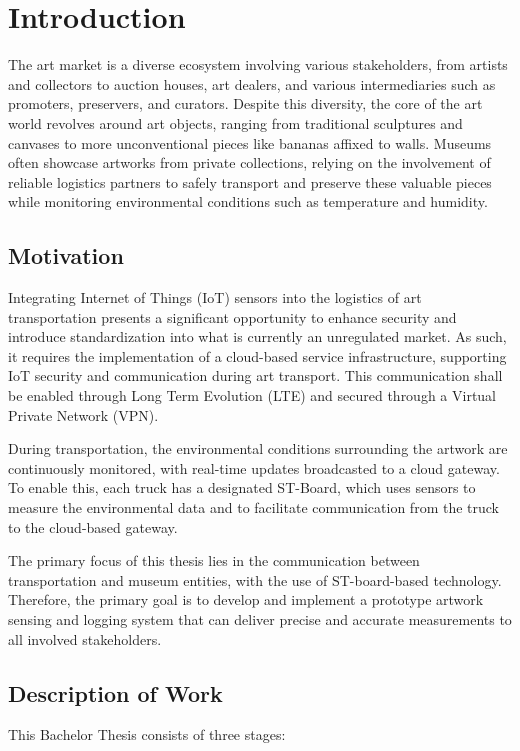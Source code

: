 \chapter{Introduction}
The art market is a diverse ecosystem involving various stakeholders,  from artists and collectors to auction houses, art dealers, and various intermediaries such as promoters, preservers, and curators. Despite this diversity, the core of the art world revolves around art objects, ranging from traditional sculptures and canvases to more unconventional pieces like bananas affixed to walls. Museums often showcase artworks from private collections, relying on the involvement of reliable logistics partners to safely transport and preserve these valuable pieces while monitoring environmental conditions such as temperature and humidity. 

\section{Motivation}
Integrating Internet of Things (IoT) sensors into the logistics of art transportation presents a significant opportunity to enhance security and introduce standardization into what is currently an unregulated market.
As such, it requires the implementation of a cloud-based service infrastructure, supporting IoT security and communication during art transport. This communication shall be enabled
through Long Term Evolution (LTE) and secured through a Virtual Private Network (VPN). 

During transportation, the environmental conditions surrounding the artwork are continuously monitored, with real-time updates broadcasted to a cloud gateway. To enable this, each truck has a designated ST-Board, which uses sensors to measure the environmental data and to facilitate communication from the truck to the cloud-based gateway.

The primary focus of this thesis lies in the communication between transportation and museum entities, with the use of ST-board-based technology. Therefore, the primary goal is to develop and implement a prototype artwork sensing and logging system that can deliver precise and accurate measurements to all involved stakeholders.

\section{Description of Work}
This Bachelor Thesis consists of three stages:

